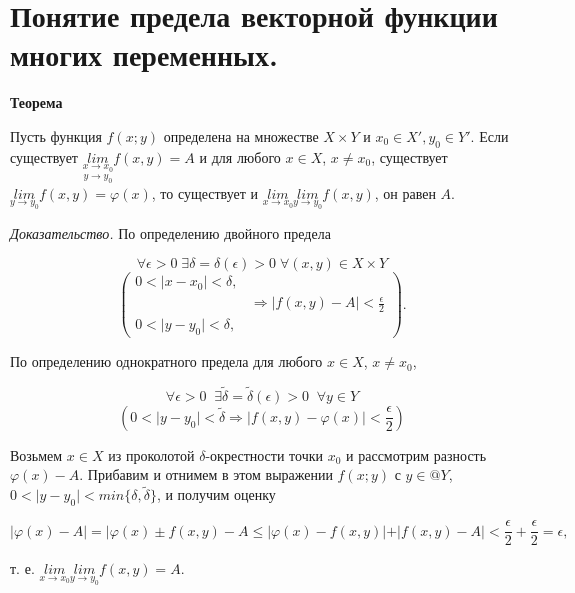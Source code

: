 
\section{Понятие предела векторной функции многих переменных.}


\textbf{Теорема} 

Пусть функция $f(x;y)$ определена на множестве $X\times{Y}$ и $x_0\in{X'}, y_0\in{Y'}$. 
Если существует $\underset{y\rightarrow{y_0}}{\underset{x\rightarrow{x_0}}{lim}}f(x,y)=A$ и для любого $x\in{X}$, $x\neq{x_0}$, 
существует $\underset{y\rightarrow{y_0}}{lim}f(x,y)=\varphi(x)$, то существует и 
$\underset{x\rightarrow{x_0}}{lim}\underset{y\rightarrow{y_0}}{lim}f(x,y)$, он равен $A$.

\textit{Доказательство.} По определению двойного предела

$$\forall\epsilon>0\;\exists\delta=\delta(\epsilon)>0\;\forall(x,y)\in{X}\times{Y}$$
$$
\begin{pmatrix}
0<\vert{x-x_0}\vert<\delta, & \; \\
\; & \Rightarrow\vert{f(x,y)-A}\vert<\frac{\epsilon}{2} \\
0<\vert{y-y_0}\vert<\delta, & \;
\end{pmatrix}
.$$

По определению однократного предела для любого $x\in{X}$, $x\neq{x_0}$,

$$\forall\epsilon>0\;\;\exists\tilde{\delta}=\tilde{\delta}(\epsilon)>0\;\;\forall{y}\in{Y}$$
$$(0<\vert{y-y_0}\vert<\tilde{\delta}\Rightarrow\vert{f(x,y)-\varphi(x)}\vert<\frac{\epsilon}{2})$$

Возьмем $x\in{X}$ из проколотой $\delta$-окрестности точки $x_0$ и рассмотрим разность $\varphi(x)-A$. 
Прибавим и отнимем в этом выражении $f(x; y)$ с $y\in@Y$, $0<\vert{y-y_0}\vert<min\lbrace\delta,\tilde{\delta}\rbrace$, 
и получим оценку

$$\vert\varphi(x)-A\vert=\vert\varphi(x)\pm{f(x,y)}-A\leq\vert\varphi(x)-f(x,y)\vert+\vert{f(x,y)-A}\vert<\frac{\epsilon}{2}+\frac{\epsilon}{2}=\epsilon,$$

т. е. $\underset{x\rightarrow{x_0}}{lim}\underset{y\rightarrow{y_0}}{lim}f(x,y)=A$.
